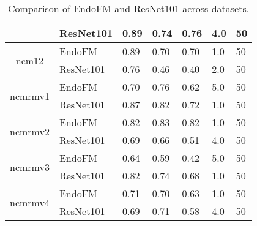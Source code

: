 \begin{table}[h]
\begin{tabular}{cllllll}
     & ResNet101 & 0.89 & 0.74 & 0.76 & 4.0 & 50 \\
    \midrule
    \multirow{2}{*}{ncm12}
 & EndoFM & 0.89 & 0.70 & 0.70 & 1.0 & 50 \\
     & ResNet101 & 0.76 & 0.46 & 0.40 & 2.0 & 50 \\
    \midrule
    \multirow{2}{*}{ncmrmv1}
 & EndoFM & 0.70 & 0.76 & 0.62 & 5.0 & 50 \\
     & ResNet101 & 0.87 & 0.82 & 0.72 & 1.0 & 50 \\
    \midrule
    \multirow{2}{*}{ncmrmv2}
 & EndoFM & 0.82 & 0.83 & 0.82 & 1.0 & 50 \\
     & ResNet101 & 0.69 & 0.66 & 0.51 & 4.0 & 50 \\
    \midrule
    \multirow{2}{*}{ncmrmv3}
 & EndoFM & 0.64 & 0.59 & 0.42 & 5.0 & 50 \\
     & ResNet101 & 0.82 & 0.74 & 0.68 & 1.0 & 50 \\
    \midrule
    \multirow{2}{*}{ncmrmv4}
 & EndoFM & 0.71 & 0.70 & 0.63 & 1.0 & 50 \\
     & ResNet101 & 0.69 & 0.71 & 0.58 & 4.0 & 50 \\
    \midrule
    \bottomrule
    \end{tabular}
    \vspace{-0.1in}
    \caption{Comparison of EndoFM and ResNet101 across datasets.}
    \label{tab:performance_comparison}
\end{table}
